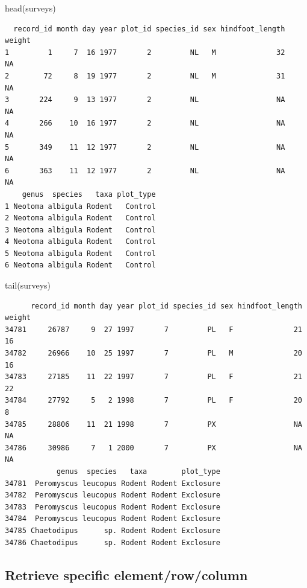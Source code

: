 \documentclass[
  letterpaper,
  DIV=11,
  numbers=noendperiod]{scrreprt}
\newenvironment{Shaded}{\begin{snugshade}}{\end{snugshade}}
\newcommand{\FunctionTok}[1]{\textcolor[rgb]{0.28,0.35,0.67}{#1}}
\newcommand{\NormalTok}[1]{\textcolor[rgb]{0.00,0.23,0.31}{#1}}
\begin{document}
\begin{Shaded}
\begin{Highlighting}[]
\FunctionTok{head}\NormalTok{(surveys)}
\end{Highlighting}
\end{Shaded}

\begin{verbatim}
  record_id month day year plot_id species_id sex hindfoot_length weight
1         1     7  16 1977       2         NL   M              32     NA
2        72     8  19 1977       2         NL   M              31     NA
3       224     9  13 1977       2         NL                  NA     NA
4       266    10  16 1977       2         NL                  NA     NA
5       349    11  12 1977       2         NL                  NA     NA
6       363    11  12 1977       2         NL                  NA     NA
    genus  species   taxa plot_type
1 Neotoma albigula Rodent   Control
2 Neotoma albigula Rodent   Control
3 Neotoma albigula Rodent   Control
4 Neotoma albigula Rodent   Control
5 Neotoma albigula Rodent   Control
6 Neotoma albigula Rodent   Control
\end{verbatim}

\begin{Shaded}
\begin{Highlighting}[]
\FunctionTok{tail}\NormalTok{(surveys)}
\end{Highlighting}
\end{Shaded}

\begin{verbatim}
      record_id month day year plot_id species_id sex hindfoot_length weight
34781     26787     9  27 1997       7         PL   F              21     16
34782     26966    10  25 1997       7         PL   M              20     16
34783     27185    11  22 1997       7         PL   F              21     22
34784     27792     5   2 1998       7         PL   F              20      8
34785     28806    11  21 1998       7         PX                  NA     NA
34786     30986     7   1 2000       7         PX                  NA     NA
            genus  species   taxa        plot_type
34781  Peromyscus leucopus Rodent Rodent Exclosure
34782  Peromyscus leucopus Rodent Rodent Exclosure
34783  Peromyscus leucopus Rodent Rodent Exclosure
34784  Peromyscus leucopus Rodent Rodent Exclosure
34785 Chaetodipus      sp. Rodent Rodent Exclosure
34786 Chaetodipus      sp. Rodent Rodent Exclosure
\end{verbatim}

\subsection{Retrieve specific
element/row/column}\label{retrieve-specific-elementrowcolumn}
\end{document}
